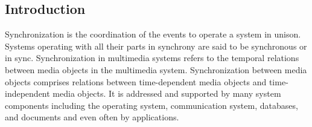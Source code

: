 \subsection{Introduction}
Synchronization is the coordination of the events to operate a system in unison. Systems operating with all their parts in synchrony are said to be synchronous or in sync. Synchronization in multimedia systems refers to the temporal relations between media objects in the multimedia system. Synchronization between media objects comprises	relations between time-dependent media objects and time-independent media objects. It is addressed and supported by many system components including the operating system, communication system, databases, and documents and even often by applications.
	
%
%	
%	
%	
